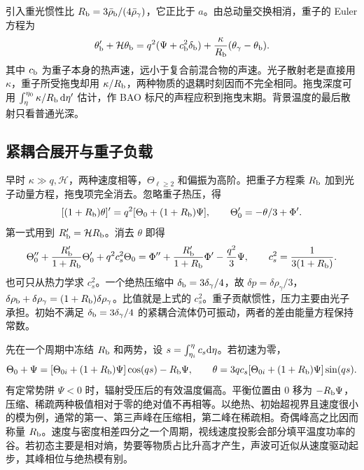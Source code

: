 引入重光惯性比 $R_{\rm b}=3\bar\rho_{\rm b}/(4\bar\rho_\gamma)$，它正比于 $a$。由总动量交换相消，重子的 Euler 方程为
\[
 \theta_{\rm b}'+\mathcal H\theta_{\rm b}
  =q^2(\Psi+c_{\rm b}^2\delta_{\rm b})
     +\frac{\kappa}{R_{\rm b}}(\theta_\gamma-\theta_{\rm b}).
\]
其中 $c_{\rm b}$ 为重子本身的热声速，远小于复合前混合物的声速。光子散射老是直接用 $\kappa$，重子所受拖曳却用 $\kappa/R_{\rm b}$，两种物质的退耦时刻因而不完全相同。拖曳深度可用 $\int_\eta^{\eta_0}\kappa/R_{\rm b}\,\dd\eta'$ 估计，作 BAO 标尺的声程应积到拖曳末期。背景温度的最后散射只看普通光深。

\subsection{紧耦合展开与重子负载}

早时 $\kappa\gg q,\mathcal H$，两种速度相等，$\Theta_{\ell\ge2}$ 和偏振为高阶。把重子方程乘 $R_{\rm b}$ 加到光子动量方程，拖曳项完全消去。忽略重子热压，得
\[
 [(1+R_{\rm b})\theta]'=q^2[\Theta_0+(1+R_{\rm b})\Psi],
 \qquad \Theta_0'=-\theta/3+\Phi' .
\]
第一式用到 $R_{\rm b}'=\mathcal H R_{\rm b}$。消去 $\theta$ 即得
\begin{equation}\label{eq:cl-sound}
 \Theta_0''+\frac{R_{\rm b}'}{1+R_{\rm b}}\Theta_0'
      +q^2 c_s^2\Theta_0
 =\Phi''+\frac{R_{\rm b}'}{1+R_{\rm b}}\Phi'-\frac{q^2}{3}\Psi,
 \qquad c_s^2=\frac{1}{3(1+R_{\rm b})}.
\end{equation}
也可只从热力学求 $c_s^2$。一个绝热压缩中 $\delta_{\rm b}=3\delta_\gamma/4$，故 $\delta p=\delta\rho_\gamma/3$，$\delta\rho_{\rm b}+\delta\rho_\gamma=(1+R_{\rm b})\delta\rho_\gamma$。比值就是上式的 $c_s^2$。重子贡献惯性，压力主要由光子承担。初始不满足 $\delta_{\rm b}=3\delta_\gamma/4$ 的紧耦合流体仍可振动，两者的差由能量方程保持常数。

先在一个周期中冻结 $R_{\rm b}$ 和两势，设 $s=\int_{\eta_i}^\eta c_s\dd\eta$。若初速为零，
\[
 \Theta_0+\Psi
   =[\Theta_{0i}+(1+R_{\rm b})\Psi]\cos(qs)-R_{\rm b}\Psi,\qquad
 \theta=3q c_s[\Theta_{0i}+(1+R_{\rm b})\Psi]\sin(qs).
\]
有定常势阱 $\Psi<0$ 时，辐射受压后的有效温度偏高。平衡位置由 $0$ 移为 $-R_{\rm b}\Psi$，压缩、稀疏两种极值相对于零的绝对值不再相等。以绝热、初始超视界且速度很小的模为例，通常的第一、第三声峰在压缩相，第二峰在稀疏相。奇偶峰高之比因而称量 $R_{\rm b}$。速度与密度相差四分之一个周期，视线速度投影会部分填平温度功率的谷。若初态主要是相对熵，势要等物质占比升高才产生，声波可近似从速度驱动起步，其峰相位与绝热模有别。

